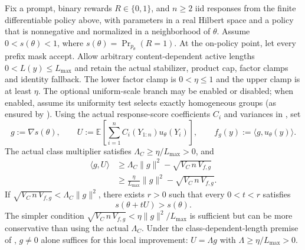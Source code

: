 \begin{corollary}
\label{cor:binary-local-improvement}
Fix a prompt, binary rewards $R\in\{0,1\}$, and $n\ge2$ iid responses
from the finite differentiable policy above, with parameters in a real
Hilbert space and a policy that is nonnegative and normalized in a
neighborhood of $\theta$. Assume $0<s(\theta)<1$, where
$s(\theta)=\Pr_{p_\theta}(R=1)$. At the on-policy point, let every prefix
mask accept. Allow arbitrary content-dependent
active lengths $0<L(y)\le L_{\max}$ and retain the actual stabilizer,
product cap, factor clamps and identity fallback. The lower factor clamp
is $0<\eta\le1$ and the upper clamp is at least $\eta$.
The optional uniform-scale branch may be enabled or disabled; when enabled,
assume its uniformity test selects exactly homogeneous groups
(as ensured by ).
Using the actual response-score coefficients $C_i$ and variances in
, set
\begin{equation*}
 g:=\nabla s(\theta),\qquad
 U:=\mathbb E\!\left[\sum_{i=1}^n C_i(Y_{1:n})u_\theta(Y_i)\right],
 \qquad f_g(y):=\langle g,u_\theta(y)\rangle.
\end{equation*}
The actual class multiplier satisfies $\Lambda_C\ge\eta/L_{\max}>0$, and
\begin{align*}
 \langle g,U\rangle
 &\ge \Lambda_C\|g\|^2-\sqrt{V_C\,n\,V_{f,g}}\\
 &\ge \frac{\eta}{L_{\max}}\|g\|^2-\sqrt{V_C\,n\,V_{f,g}}.
\end{align*}
If $\sqrt{V_C\,n\,V_{f,g}}<\Lambda_C\|g\|^2$, there exists
$r>0$ such that every $0<t<r$ satisfies
\begin{equation*}
 s(\theta+tU)>s(\theta).
\end{equation*}
The simpler condition
$\sqrt{V_C\,n\,V_{f,g}}<\eta\|g\|^2/L_{\max}$ is sufficient but can
be more conservative than using the actual $\Lambda_C$.
Under the class-dependent-length premise of
, $g\ne0$ alone suffices for this local
improvement: $U=\Lambda g$ with $\Lambda\ge\eta/L_{\max}>0$.
\end{corollary}

